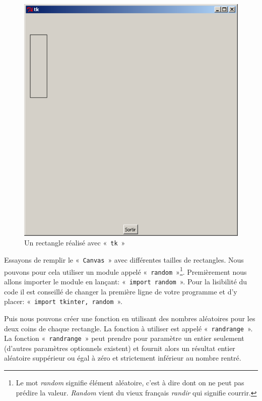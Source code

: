 \begin{figure}[h!]
\centering
\includegraphics[scale=0.4]{images/rectangle}
\caption{Un rectangle réalisé avec «~\texttt{tk}~»}\label{fig:rectangle}
\end{figure}
 
Essayons de remplir le «~\texttt{Canvas}~» avec différentes tailles de rectangles. Nous pouvons pour cela utiliser un module appelé «~\texttt{random}~»\footnote{Le mot \emph{random} signifie élément aléatoire, c'est à dire dont on ne peut pas prédire la valeur. \emph{Random} vient du vieux français \emph{randir} qui signifie courrir.}. Premièrement nous allons importer le module en lançant: «~\texttt{import random}~». Pour la lisibilité du code il est conseillé de changer la première ligne de votre programme et d'y placer: «~\texttt{import tkinter, random}~».

Puis  nous pouvons créer une fonction en utilisant des nombres aléatoires pour les deux coins de chaque rectangle. La fonction à utiliser est appelé «~\texttt{randrange}~». La fonction «~\texttt{randrange}~» peut prendre pour paramètre un entier seulement (d'autres paramètres optionnels existent) et fournit alors un résultat entier aléatoire suppérieur ou égal à zéro et strictement inférieur au nombre rentré.

